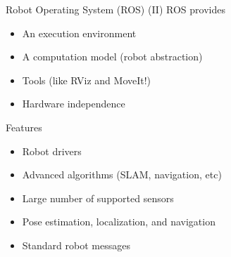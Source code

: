 \documentclass[10pt,compress]{beamer} %
\begin{document}
\begin{frame}{Robot Operating System (ROS) (II)}
	ROS provides
	\begin{itemize}
		\item An execution environment
		\item A computation model (robot abstraction)
		\item Tools (like RViz and MoveIt!)
		\item Hardware independence
	\end{itemize}

	Features
	\begin{itemize}
		\item Robot drivers
		\item Advanced algorithms (SLAM, navigation, etc)
		\item Large number of supported sensors
		\item Pose estimation, localization, and navigation
		\item Standard robot messages
	\end{itemize}
\end{frame}
\end{document}
